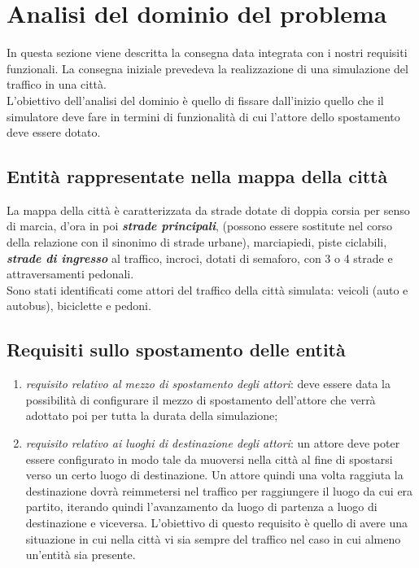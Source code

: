 \section{Analisi del dominio del problema}
In questa sezione viene descritta la consegna data integrata con i nostri requisiti funzionali. La consegna iniziale prevedeva la realizzazione di una simulazione del traffico in una città. \\
L'obiettivo dell'analisi del dominio è quello di fissare dall'inizio quello che il simulatore deve fare in termini di funzionalità di cui l'attore dello spostamento deve essere dotato.

\subsection{Entità rappresentate nella mappa della città}
\label{firstmappa}
La mappa della città è caratterizzata da strade dotate di doppia corsia per senso di marcia, d'ora in poi \textit{\textbf{strade principali}}, (possono essere sostitute nel corso della relazione con il sinonimo di strade urbane), marciapiedi, piste ciclabili, \textit{\textbf{strade di ingresso}} al traffico, incroci, dotati di semaforo, con 3 o 4 strade e attraversamenti pedonali.\\
Sono stati identificati come attori del traffico della città simulata: veicoli (auto e autobus), biciclette e pedoni.

\subsection{Requisiti sullo spostamento delle entità}
\begin{enumerate}
\item {\textit{requisito relativo al mezzo di spostamento degli attori}}: deve essere data la possibilità di configurare il mezzo di spostamento dell'attore che verrà adottato poi per tutta la durata della simulazione;
\item {\textit{requisito relativo ai luoghi di destinazione degli attori}}: un attore deve poter essere configurato in modo tale da muoversi nella città al fine di spostarsi verso un certo luogo di destinazione.
Un attore quindi una volta raggiuta la destinazione dovrà reimmetersi nel traffico per raggiungere il luogo da cui era partito, iterando quindi l'avanzamento da luogo di partenza a luogo di destinazione e viceversa. L'obiettivo di questo requisito è quello di avere una situazione in cui nella città vi sia sempre del traffico nel caso in cui almeno un'entità sia presente.
\end{enumerate}

